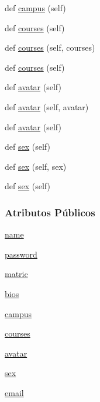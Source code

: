 \begin{DoxyCompactItemize}
\item 
def \hyperlink{classELO_1_1EntityUnit_1_1Professor_ab460e53bc057c0a793757ade5c83c45b}{campus} (self)
\item 
def \hyperlink{classELO_1_1EntityUnit_1_1Professor_aa1835a6fafa70e65407f20c14797c40e}{courses} (self)
\item 
def \hyperlink{classELO_1_1EntityUnit_1_1Professor_a69947ff95fce19fbf11d1e679d237e80}{courses} (self, courses)
\item 
def \hyperlink{classELO_1_1EntityUnit_1_1Professor_aa1835a6fafa70e65407f20c14797c40e}{courses} (self)
\item 
def \hyperlink{classELO_1_1EntityUnit_1_1Professor_a021f8be3773b9c9c04c17c0f078c76ee}{avatar} (self)
\item 
def \hyperlink{classELO_1_1EntityUnit_1_1Professor_af8680700af41e9dfcad2eb23dc7820ab}{avatar} (self, avatar)
\item 
def \hyperlink{classELO_1_1EntityUnit_1_1Professor_a021f8be3773b9c9c04c17c0f078c76ee}{avatar} (self)
\item 
def \hyperlink{classELO_1_1EntityUnit_1_1Professor_a400ccf21f0d981e6a61e694403316a52}{sex} (self)
\item 
def \hyperlink{classELO_1_1EntityUnit_1_1Professor_a0e9f55e620ec3bc1903aca9388fa5a29}{sex} (self, sex)
\item 
def \hyperlink{classELO_1_1EntityUnit_1_1Professor_a400ccf21f0d981e6a61e694403316a52}{sex} (self)
\end{DoxyCompactItemize}
\subsubsection*{Atributos Públicos}
\begin{DoxyCompactItemize}
\item 
\hyperlink{classELO_1_1EntityUnit_1_1Professor_ae85cc0fc9c64a277111a85e87efbe049}{name}
\item 
\hyperlink{classELO_1_1EntityUnit_1_1Professor_af0810854479e9f9a806eb6bfe7468e60}{password}
\item 
\hyperlink{classELO_1_1EntityUnit_1_1Professor_afc64d3f1b0e7c88530c7ee62f67ef671}{matric}
\item 
\hyperlink{classELO_1_1EntityUnit_1_1Professor_a2e403e0bfc353dcdf9988140d61d5ca7}{bios}
\item 
\hyperlink{classELO_1_1EntityUnit_1_1Professor_ad95cfc8959dcb02a6afff422703d4dde}{campus}
\item 
\hyperlink{classELO_1_1EntityUnit_1_1Professor_a6eb0d2789bb8750fb275aca0f8bb74bb}{courses}
\item 
\hyperlink{classELO_1_1EntityUnit_1_1Professor_a593a0636e87dcdd9ced2e6b7494a45dc}{avatar}
\item 
\hyperlink{classELO_1_1EntityUnit_1_1Professor_ac049dc360c4af27037158e33577288e1}{sex}
\item 
\hyperlink{classELO_1_1EntityUnit_1_1Professor_a7c6f76f185515050334dc74a030043a7}{email}
\end{DoxyCompactItemize}


